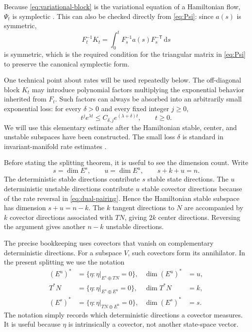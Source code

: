 \documentclass[11pt]{article}
\theoremstyle{definition}
\theoremstyle{remark}
\newcommand{\dd}{\mathrm{d}}
\newcommand{\cT}{\mathsf{T}}
\begin{document}
Because \eqref{eq:variational-block} is the variational equation of a Hamiltonian flow, $\Psi_t$ is symplectic \cite{MarsdenRatiu1999}.  This can also be checked directly from \eqref{eq:Psi}: since $a(s)$ is symmetric,
\begin{equation}
F_t^{-1}K_t
=\int_0^tF_s^{-1}a(s)F_s^{-\cT}\,\dd s
\label{eq:symmetric-FK}
\end{equation}
is symmetric, which is the required condition for the triangular matrix in \eqref{eq:Psi} to preserve the canonical symplectic form.

One technical point about rates will be used repeatedly below.  The off-diagonal block $K_t$ may introduce polynomial factors multiplying the exponential behavior inherited from $F_t$.  Such factors can always be absorbed into an arbitrarily small exponential loss: for every $\delta>0$ and every fixed integer $j\ge0$,
\begin{equation}
t^j e^{\lambda t}\le C_{\delta,j}e^{(\lambda+\delta)t},
\qquad t\ge0.
\label{eq:polynomial-loss}
\end{equation}
We will use this elementary estimate after the Hamiltonian stable, center, and unstable subspaces have been constructed.  The small loss $\delta$ is standard in invariant-manifold rate estimates \cite{Fenichel1974,HirschPughShub1977,ChowLiuYi2000Smooth}.

Before stating the splitting theorem, it is useful to see the dimension count.  Write
\begin{equation}
s=\dim E^s,
\qquad u=\dim E^u,
\qquad s+k+u=n.
\end{equation}
The deterministic stable directions contribute $s$ stable state directions.  The $u$ deterministic unstable directions contribute $u$ stable covector directions because of the rate reversal in \eqref{eq:dual-pairing}.  Hence the Hamiltonian stable subspace has dimension $s+u=n-k$.  The $k$ tangent directions to $N$ are accompanied by $k$ covector directions associated with $TN$, giving $2k$ center directions.  Reversing the argument gives another $n-k$ unstable directions.

The precise bookkeeping uses covectors that vanish on complementary deterministic directions.  For a subspace $V$, such covectors form its annihilator.  In the present splitting we use the notation
\begin{align}
(E^u)^*&=\{\eta:\eta|_{E^s\oplus TN}=0\},
&\dim(E^u)^*&=u,\\
T^*N&=\{\eta:\eta|_{E^s\oplus E^u}=0\},
&\dim T^*N&=k,\\
(E^s)^*&=\{\eta:\eta|_{TN\oplus E^u}=0\},
&\dim(E^s)^*&=s.
\label{eq:annihilator-splitting}
\end{align}
The notation simply records which deterministic directions a covector measures.  It is useful because $\eta$ is intrinsically a covector, not another state-space vector.
\end{document}
